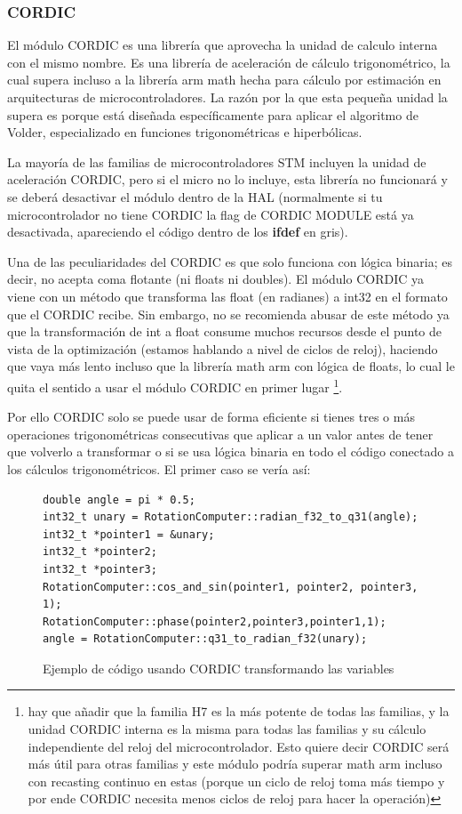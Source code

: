 \documentclass{report}
\begin{document}
\subsubsection{CORDIC}
El módulo CORDIC es una librería que aprovecha la unidad de calculo interna con el mismo nombre. Es una librería de aceleración de cálculo trigonométrico, la cual supera incluso a la librería arm math hecha para cálculo por estimación en arquitecturas de microcontroladores. La razón por la que esta pequeña unidad la supera es porque está diseñada específicamente para aplicar el algoritmo de Volder, especializado en funciones trigonométricas e hiperbólicas. \par
La mayoría de las familias de microcontroladores STM incluyen la unidad de aceleración CORDIC, pero si el micro no lo incluye, esta librería no funcionará y se deberá desactivar el módulo dentro de la HAL (normalmente si tu microcontrolador no tiene CORDIC la flag de CORDIC MODULE está ya desactivada, apareciendo el código dentro de los \textbf{ifdef} en gris).
\par \vspace{0.3cm}
Una de las peculiaridades del CORDIC es que solo funciona con lógica binaria; es decir, no acepta coma flotante (ni floats ni doubles). El módulo CORDIC ya viene con un método que transforma las float (en radianes) a int32 en el formato que el CORDIC recibe. Sin embargo, no se recomienda abusar de este método ya que la transformación de int a float consume muchos recursos desde el punto de vista de la optimización (estamos hablando a nivel de ciclos de reloj), haciendo que vaya más lento incluso que la librería math arm con lógica de floats, lo cual le quita el sentido a usar el módulo CORDIC en primer lugar \footnote{hay que añadir que la familia H7 es la más potente de todas las familias, y la unidad CORDIC interna es la misma para todas las familias y su cálculo independiente del reloj del microcontrolador. Esto quiere decir CORDIC será más útil para otras familias y este módulo podría superar math arm incluso con recasting continuo en estas (porque un ciclo de reloj toma más tiempo y por ende CORDIC necesita menos ciclos de reloj para hacer la operación)}. \par
Por ello CORDIC solo se puede usar de forma eficiente si tienes tres o más operaciones trigonométricas consecutivas que aplicar a un valor antes de tener que volverlo a transformar o si se usa lógica binaria en todo el código conectado a los cálculos trigonométricos. El primer caso se vería así:
\begin{figure}[h]
\begin{lstlisting}
double angle = pi * 0.5;
int32_t unary = RotationComputer::radian_f32_to_q31(angle); 
int32_t *pointer1 = &unary;
int32_t *pointer2;
int32_t *pointer3;
RotationComputer::cos_and_sin(pointer1, pointer2, pointer3, 1);
RotationComputer::phase(pointer2,pointer3,pointer1,1);
angle = RotationComputer::q31_to_radian_f32(unary);
\end{lstlisting} 
\caption{Ejemplo de código usando CORDIC transformando las variables}
  \label{CORDICwCastcode}
\end{figure}
\end{document}
